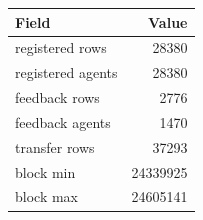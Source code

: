 \begin{tabular}{lr}\hline
Field & Value \\ \hline
registered rows & 28380 \\ 
registered agents & 28380 \\ 
feedback rows & 2776 \\ 
feedback agents & 1470 \\ 
transfer rows & 37293 \\ 
block min & 24339925 \\ 
block max & 24605141 \\ 
\hline\end{tabular}
